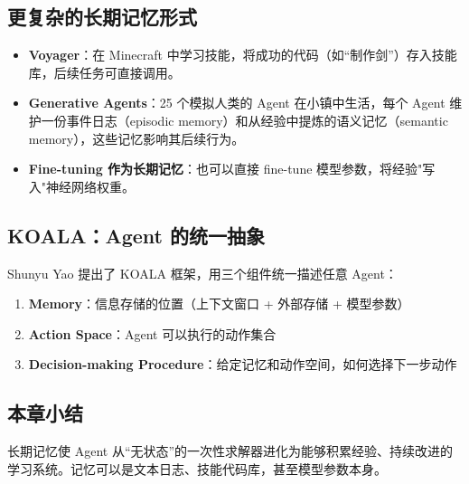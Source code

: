 \subsection{更复杂的长期记忆形式}

\begin{itemize}
    \item \textbf{Voyager}：在 Minecraft 中学习技能，将成功的代码（如``制作剑''）存入技能库，后续任务可直接调用。
    \item \textbf{Generative Agents}：25 个模拟人类的 Agent 在小镇中生活，每个 Agent 维护一份事件日志（episodic memory）和从经验中提炼的语义记忆（semantic memory），这些记忆影响其后续行为。
    \item \textbf{Fine-tuning 作为长期记忆}：也可以直接 fine-tune 模型参数，将经验"写入"神经网络权重。
\end{itemize}

\subsection{KOALA：Agent 的统一抽象}

Shunyu Yao 提出了 KOALA 框架，用三个组件统一描述任意 Agent：

\begin{enumerate}
    \item \textbf{Memory}：信息存储的位置（上下文窗口 + 外部存储 + 模型参数）
    \item \textbf{Action Space}：Agent 可以执行的动作集合
    \item \textbf{Decision-making Procedure}：给定记忆和动作空间，如何选择下一步动作
\end{enumerate}

\subsection{本章小结}

长期记忆使 Agent 从``无状态''的一次性求解器进化为能够积累经验、持续改进的学习系统。记忆可以是文本日志、技能代码库，甚至模型参数本身。

